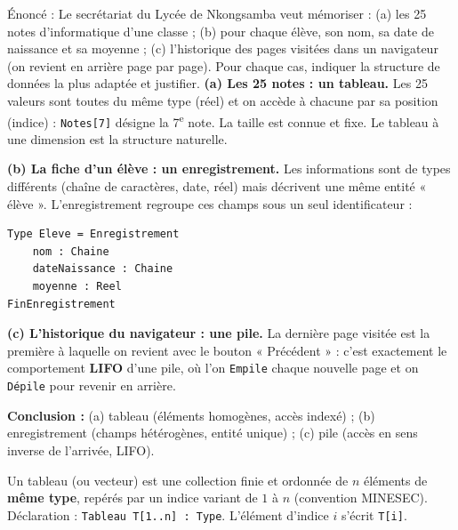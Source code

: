 \documentclass[11pt]{article}
\newcommand{\cle}[1]{{\popxbold\color{popdark}#1}}
\newcounter{popsec}
\newcounter{popsub}
\newcommand{\courssub}[1]{%
  \stepcounter{popsub}%
  \par\vspace{9pt}\noindent{\popxbold\fontsize{11.5}{13}\selectfont\color{popink}{\color{poporange}\thepopsec.\thepopsub}\hspace{6pt}#1}\par\nopagebreak\vspace{4pt}
}
\begin{document}
\begin{exoresolu}
Énoncé : Le secrétariat du Lycée de Nkongsamba veut mémoriser : (a) les 25 notes d'informatique d'une classe ; (b) pour chaque élève, son nom, sa date de naissance et sa moyenne ; (c) l'historique des pages visitées dans un navigateur (on revient en arrière page par page). Pour chaque cas, indiquer la structure de données la plus adaptée et justifier.
\tcblower
\textbf{(a) Les 25 notes : un \cle{tableau}.} Les 25 valeurs sont toutes du même type (réel) et on accède à chacune par sa position (indice) : \texttt{Notes[7]} désigne la 7\textsuperscript{e} note. La taille est connue et fixe. Le tableau à une dimension est la structure naturelle.

\textbf{(b) La fiche d'un élève : un \cle{enregistrement}.} Les informations sont de types différents (chaîne de caractères, date, réel) mais décrivent une même entité « élève ». L'enregistrement regroupe ces champs sous un seul identificateur :
\begin{lstlisting}
Type Eleve = Enregistrement
    nom : Chaine
    dateNaissance : Chaine
    moyenne : Reel
FinEnregistrement
\end{lstlisting}

\textbf{(c) L'historique du navigateur : une \cle{pile}.} La dernière page visitée est la première à laquelle on revient avec le bouton « Précédent » : c'est exactement le comportement \textbf{LIFO} d'une pile, où l'on \texttt{Empile} chaque nouvelle page et on \texttt{Dépile} pour revenir en arrière.

\textbf{Conclusion :} (a) tableau (éléments homogènes, accès indexé) ; (b) enregistrement (champs hétérogènes, entité unique) ; (c) pile (accès en sens inverse de l'arrivée, LIFO).
\end{exoresolu}

\courssub{Le type tableau à une dimension}

\begin{definition}
Un \cle{tableau} (ou \cle{vecteur}) est une collection finie et ordonnée de $n$ éléments de \textbf{même type}, repérés par un indice variant de $1$ à $n$ (convention MINESEC). Déclaration : \texttt{Tableau T[1..n] : Type}. L'élément d'indice $i$ s'écrit \texttt{T[i]}.
\end{definition}
\end{document}
